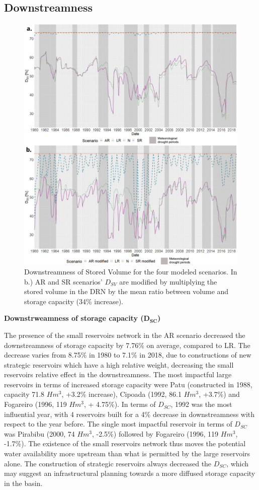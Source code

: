 \documentclass[draft]{agujournal2019}
\begin{document}
\subsection{Downstreamness}
\begin{figure}
 \noindent\includegraphics[width=\textwidth]{images/Figure_8.png}
 \caption{Downstreamness of Stored Volume for the four modeled scenarios. In b.) AR and SR scenarios’ $D_{SV}$ are modified by multiplying the stored volume in the DRN by the mean ratio between volume and storage capacity (34\% increase).}
 \label{fig8}
\end{figure}

\textbf{Downstrweamness of storage capacity ($\bm{D_{SC}}$)}

The presence of the small reservoirs network in the AR scenario decreased the downstreamness of storage capacity by 7.76\% on average, compared to LR. The decrease varies from 8.75\% in 1980 to 7.1\% in 2018, due to constructions of new strategic reservoirs which have a high relative weight, decreasing the small reservoirs relative effect in the downstreamness. The most impactful large reservoirs in terms of increased storage capacity were Patu (constructed in 1988, capacity 71.8 $Hm^3$, +3.2\% increase),  Cipoada (1992, 86.1 $Hm^3$, +3.7\%) and Fogareiro (1996, 119 $Hm^3$, + 4.75\%). In terms of $D_{SC}$, 1992 was the most influential year, with 4 reservoirs built for a 4\% decrease in downstreamness with respect to the year before. The single most impactful reservoir in terms of $D_{SC}$ was Pirabibu (2000, 74 $Hm^3$, -2.5\%) followed by Fogareiro (1996, 119 $Hm^3$, -1.7\%). The existence of the small reservoirs network thus moves the potential water availability more upstream than what is permitted by the large reservoirs alone. The construction of strategic reservoirs always decreased the $D_{SC}$, which may suggest an infrastructural planning towards a more diffused storage capacity in the basin.
\end{document}
